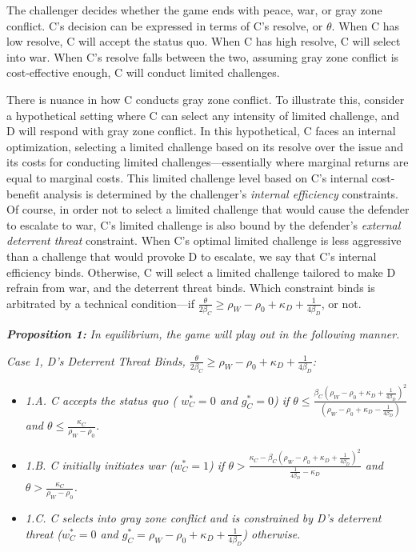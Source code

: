 \documentclass[
]{article}
\begin{document}
The challenger decides whether the game ends with peace, war, or gray zone conflict. C's decision can be expressed in terms of C's resolve, or \(\theta\). When C has low resolve, C will accept the status quo. When C has high resolve, C will select into war. When C's resolve falls between the two, assuming gray zone conflict is cost-effective enough, C will conduct limited challenges.

There is nuance in how C conducts gray zone conflict. To illustrate this, consider a hypothetical setting where C can select any intensity of limited challenge, and D will respond with gray zone conflict. In this hypothetical, C faces an internal optimization, selecting a limited challenge based on its resolve over the issue and its costs for conducting limited challenges---essentially where marginal returns are equal to marginal costs. This limited challenge level based on C's internal cost-benefit analysis is determined by the challenger's \emph{internal efficiency} constraints. Of course, in order not to select a limited challenge that would cause the defender to escalate to war, C's limited challenge is also bound by the defender's \emph{external deterrent threat} constraint. When C's optimal limited challenge is less aggressive than a challenge that would provoke D to escalate, we say that C's internal efficiency binds. Otherwise, C will select a limited challenge tailored to make D refrain from war, and the deterrent threat binds. Which constraint binds is arbitrated by a technical condition---if \textit{$\frac{\theta}{2\beta_{C}}\geq\rho_{W}-\rho_{0}+\kappa_{D}+\frac{1}{4\beta_{D}}$}, or not.

\textbf{\textit{Proposition 1:}}\textit{ In equilibrium, the game will play out in the following manner.}

\textit{Case 1, D's Deterrent Threat Binds, $\frac{\theta}{2\beta_{C}}\geq\rho_{W}-\rho_{0}+\kappa_{D}+\frac{1}{4\beta_{D}}$:}

\begin{itemize}
  \item \textit{1.A. C accepts the status quo ( $w_{C}^{*}=0$ and $g_{C}^{*}=0$)
    if $\theta\leq\frac{\beta_{C}\left(\rho_{W}-\rho_{0}+\kappa_{D}+\frac{1}{4\beta_{D}}\right)^{2}}{\left(\rho_{W}-\rho_{0}+\kappa_{D}-\frac{1}{4\beta_{D}}\right)}$ and $\theta\leq\frac{\kappa_{C}}{\rho_{W}-\rho_{0}}$.} 
  \item \textit{1.B. C initially initiates war ($w_{C}^{*}=1$) if $\theta>\frac{\kappa_{C}-\beta_{C}\left(\rho_{W}-\rho_{0}+\kappa_{D}+\frac{1}{4\beta_{D}}\right)^{2}}{\frac{1}{4\beta_{D}}-\kappa_{D}}$ and $\theta>\frac{\kappa_{C}}{\rho_{W}-\rho_{0}}$.} 
  \item \textit{1.C. C selects into gray zone conflict and is constrained by D's deterrent threat ($w_{C}^{*}=0$ and $g_{C}^{*}=\rho_{W}-\rho_{0}+\kappa_{D}+\frac{1}{4\beta_{D}}$) otherwise.} 
  \end{itemize}
\end{document}
